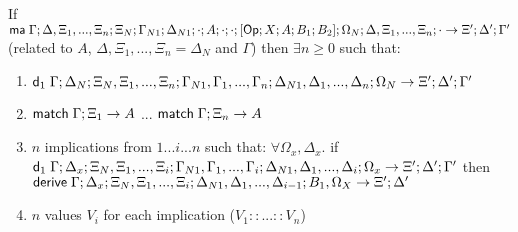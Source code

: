 \begin{lemma}
   If $\mathsf{ma} \; \Gamma; \Delta, \Xi_1, ..., \Xi_n; \Xi_N; \Gamma_{N1}; \Delta_{N1}; \cdot; A; \cdot; \cdot; [\mathsf{Op} ; X ; A ; B_1; B_2]; \Omega_N; \Delta, \Xi_1, ..., \Xi_n; \cdot \rightarrow \Xi'; \Delta'; \Gamma'$ (related to $A$, $\Delta, \Xi_1, ..., \Xi_n = \Delta_N$ and $\Gamma$) then $\exists n \geq 0$ such that:
   
   \begin{enumerate}
      \item $\mathsf{d}_1 \; \Gamma; \Delta_N; \Xi_N, \Xi_1, ..., \Xi_n; \Gamma_{N1}, \Gamma_1, ..., \Gamma_n; \Delta_{N1}, \Delta_1, ..., \Delta_n; \Omega_N \rightarrow \Xi'; \Delta'; \Gamma'$
      \item $\mathsf{match} \; \Gamma; \Xi_1 \rightarrow A$ ... $\mathsf{match} \; \Gamma; \Xi_n \rightarrow A$
      \item $n$ implications from $1...i...n$ such that: $\forall \Omega_x, \Delta_x.$ if $\mathsf{d}_1 \; \Gamma; \Delta_x; \Xi_N, \Xi_1, ..., \Xi_i; \Gamma_{N1}, \Gamma_1, ..., \Gamma_i; \Delta_{N1}, \Delta_1, ..., \Delta_i; \Omega_x \rightarrow \Xi'; \Delta'; \Gamma'$ then \\ $\mathsf{derive} \; \Gamma; \Delta_x; \Xi_N, \Xi_1, ..., \Xi_i; \Delta_{N1}, \Delta_1, ..., \Delta_{i-1}; B_1, \Omega_X \rightarrow \Xi'; \Delta'$
      \item $n$ values $V_i$ for each implication ($V_1 :: ... :: V_n$)
   \end{enumerate}
\end{lemma}


